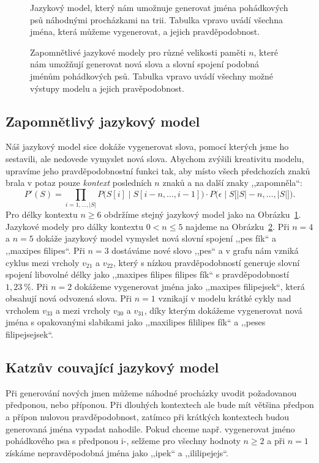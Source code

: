 \documentclass{csbulletin}
\begin{document}
\begin{figure}
\centering
\relax
\caption{Jazykový model, který nám umožnuje generovat jména pohádkových psů náhodnými procházkami na trii. Tabulka vpravo uvádí všechna jména, která můžeme vygenerovat, a jejich pravděpodobnost.}
\label{fig:language-model-6}
\end{figure}

\begin{figure}[p]
\centering

\caption{Zapomnětlivé jazykové modely pro různé velikosti paměti $n$, které nám umožňují generovat nová slova a slovní spojení podobná jménům pohádkových psů. Tabulka vpravo uvádí všechny možné výstupy modelu a jejich pravěpodobnost.}
\label{fig:language-model-5-1}
\end{figure}

\subsection{Zapomnětlivý jazykový model}
Náš jazykový model sice dokáže vygenerovat slova, pomocí kterých jsme ho sestavili, ale nedovede vymyslet nová slova. Abychom zvýšili kreativitu modelu, upravíme jeho pravděpodobnostní funkci tak, aby místo všech předchozích znaků brala v potaz pouze \emph{kontext} posledních $n$ znaků a na další znaky ,,zapomněla``:
\begin{equation}
P'(S) = \prod_{i = 1,\ldots,|S|} P\big(S[i]\mid S[i-n, \ldots, i-1]\big)\cdot P\big(\epsilon\mid S\big[|S|-n, \ldots, |S|\big]\big).
\end{equation}
Pro délky kontextu $n\geq 6$ obdržíme stejný jazykový model jako na Obrázku~\ref{fig:language-model-6}. Jazykové modely pro dálky kontextu $0<n\leq 5$ najdeme na Obrázku~\ref{fig:language-model-5-1}. Při $n=4$ a $n=5$ dokáže jazykový model vymyslet nová slovní spojení ,,pes fík`` a ,,maxipes filipes``. Při $n=3$ dostáváme nové slovo ,,pes`` a v grafu nám vzniká cyklus mezi vrcholy $v_{21}$ a $v_{22}$, který s nízkou pravděpodobností generuje slovní spojení libovolné délky jako ,,maxipes filipes filipes fík`` s pravděpodobností $1{,}23\ \%$. Při $n=2$ dokážeme vygenerovat jména jako ,,maxipes filipejsek``, která obsahují nová odvozená slova. Při $n=1$ vznikají v modelu krátké cykly nad vrcholem $v_{33}$ a mezi vrcholy $v_{30}$ a $v_{31}$, díky kterým dokážeme vygenerovat nová jména s opakovanými slabikami jako ,,maxilipes fililipes fík`` a ,,peses filipejsejsek``.

\subsection{Katzův couvající jazykový model}
Při generování nových jmen můžeme náhodné procházky uvodit požadovanou předponou, nebo příponou. Při dlouhých kontextech ale bude mít většina předpon a přípon nulovou pravděpodobnost, zatímco při krátkých kontextech budou generovaná jména vypadat nahodile. Pokud chceme např. vygenerovat jméno pohádkového psa s předponou i-, selžeme pro všechny hodnoty $n\geq 2$ a při $n=1$ získáme nepravděpodobná jména jako ,,ipek`` a ,,ililipejejs``.
\end{document}

